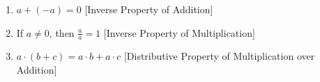 \documentclass[crop=false,class=book,oneside]{standalone}
\begin{document}
\begin{properties}
\begin{enumerate}
{                            north_shore_arithmetic_properties_%
                            mult_identity%
                        }
                        ${a}\cdot{1}=a$\hfill
                        [Identity Property of Multiplication]
                    \item
                        \label{%
                            property:%
                            north_shore_arithmetic_properties_%
                            add_inverse%
                        }
                        $a+(-a)=0$\hfill
                        [Inverse Property of Addition]
                    \item
                        \label{%
                            property:%
                            north_shore_arithmetic_properties_%
                            mult_inverse%
                        }
                        If ${a}\ne{0}$, then $\frac{a}{a}=1$\hfill
                        [Inverse Property of Multiplication]
                    \item
                        \label{%
                            property:%
                            north_shore_arithmetic_properties_%
                            distributive_property%
                        }
                        ${a}\cdot{(b+c)}%
                         ={a}\cdot{b}+{a}\cdot{c}$\hfill
                        [Distributive Property of
                         Multiplication over Addition]
                \end{enumerate}
            \end{properties}
\end{document}
